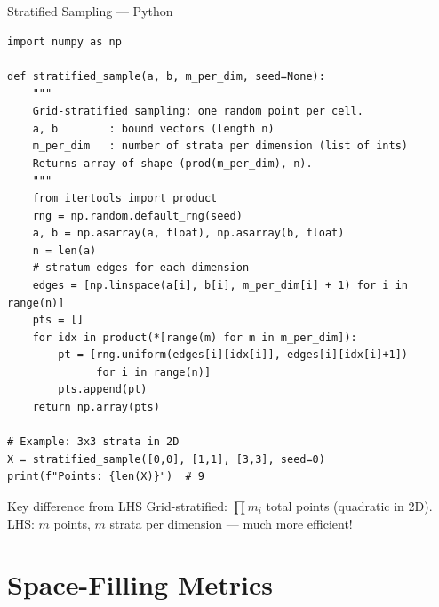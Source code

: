 \documentclass[aspectratio=169,10pt]{beamer}
\begin{document}
\begin{frame}[fragile]{Stratified Sampling --- Python}
  \begin{lstlisting}[style=python, caption={Stratified sampling in Python}]
import numpy as np

def stratified_sample(a, b, m_per_dim, seed=None):
    """
    Grid-stratified sampling: one random point per cell.
    a, b        : bound vectors (length n)
    m_per_dim   : number of strata per dimension (list of ints)
    Returns array of shape (prod(m_per_dim), n).
    """
    from itertools import product
    rng = np.random.default_rng(seed)
    a, b = np.asarray(a, float), np.asarray(b, float)
    n = len(a)
    # stratum edges for each dimension
    edges = [np.linspace(a[i], b[i], m_per_dim[i] + 1) for i in range(n)]
    pts = []
    for idx in product(*[range(m) for m in m_per_dim]):
        pt = [rng.uniform(edges[i][idx[i]], edges[i][idx[i]+1])
              for i in range(n)]
        pts.append(pt)
    return np.array(pts)

# Example: 3x3 strata in 2D
X = stratified_sample([0,0], [1,1], [3,3], seed=0)
print(f"Points: {len(X)}")  # 9
  \end{lstlisting}
  \vspace{0.2em}
  \begin{exampleblock}{Key difference from LHS}
    Grid-stratified: $\prod m_i$ total points (quadratic in 2D).
    LHS: $m$ points, $m$ strata per dimension --- much more efficient!
  \end{exampleblock}
\end{frame}

\section{Space-Filling Metrics}
\end{document}
